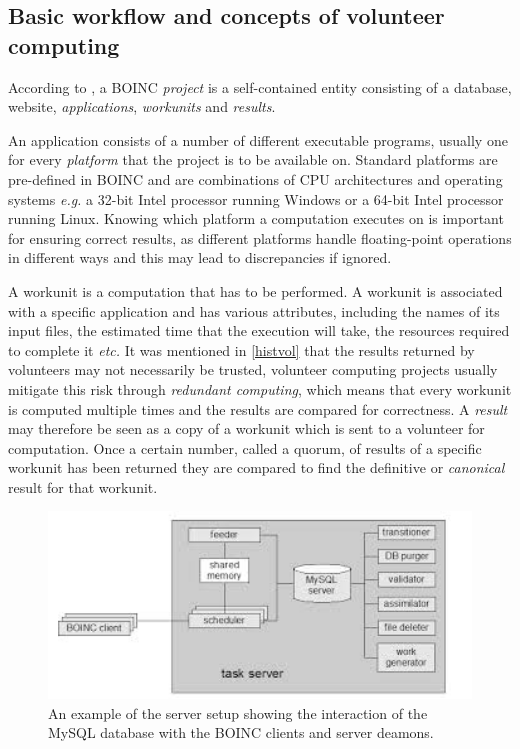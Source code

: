  \subsection{Basic workflow and concepts of volunteer computing} 
According to \cite{boincwiki}, a BOINC \emph{project} is a self-contained entity consisting of a  database, website, \emph{applications}, \emph{workunits} and \emph{results}.

An application consists of a number of different executable programs, usually one for every \emph{platform} that the project is to be available on. Standard platforms are pre-defined in BOINC and are   combinations of CPU architectures and operating systems \emph{e.g.} a 32-bit Intel processor running Windows or a 64-bit Intel processor running Linux. Knowing which platform a computation executes on is important for ensuring correct results, as different platforms handle floating-point operations in different ways and this may lead to discrepancies if ignored.

A workunit is a computation that has to be performed. A workunit is associated with a specific application and has various attributes, including the names of its input files, the estimated time that the execution will take, the resources required to complete it \emph{etc.} It was mentioned in \ref{histvol} that the results returned by volunteers may not necessarily be trusted, volunteer computing projects usually mitigate this risk through \emph{redundant computing}, which means that every workunit is computed multiple times and the results are compared for correctness. A \emph{result} may therefore be seen as a copy of a workunit which is sent to a volunteer for computation.  Once a certain number, called a quorum, of results of a specific workunit has been returned they are compared to find the definitive or \emph{canonical} result for that workunit.
\begin{figure}[htb]
\centering
\includegraphics[width=14cm]{images/serversetup}
\caption{An example of the server setup showing the interaction of the MySQL database with the BOINC clients and server deamons.}\label{fig:server}
\end{figure}

